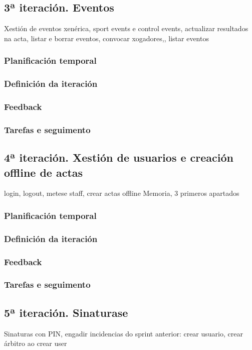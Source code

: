     \subsection{3ª iteración. Eventos}
    Xestión de eventos xenérica, sport events e control events, actualizar resultados na 
  acta, listar e borrar eventos, convocar xogadores,, listar eventos
      \subsubsection{Planificación temporal}
      \subsubsection{Definición da iteración}
      \subsubsection{Feedback}
      \subsubsection{Tarefas e seguimento}

    \subsection{4ª iteración. Xestión de usuarios e creación offline de actas}
    login, logout, metese staff, crear actas offline
    Memoria, 3 primeros apartados
      \subsubsection{Planificación temporal}
      \subsubsection{Definición da iteración}
      \subsubsection{Feedback}
      \subsubsection{Tarefas e seguimento}

    \subsection{5ª iteración. Sinaturase}
    Sinaturas con PIN, engadir incidencias
    do sprint anterior: crear usuario, crear árbitro ao crear user
